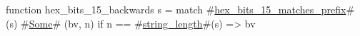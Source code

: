 function hex_bits_15_backwards s =
  match #\hyperref[sailRISCVzhexzybitszy15zymatcheszyprefix]{hex\_bits\_15\_matches\_prefix}#(s) {
      #\hyperref[sailRISCVzSome]{Some}# (bv, n) if n == #\hyperref[sailRISCVzstringzylength]{string\_length}#(s) => bv
  }

